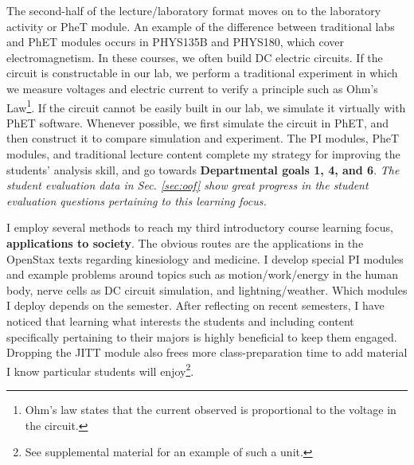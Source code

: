 \documentclass[../../../main.tex]{subfiles}
\begin{document}
The second-half of the lecture/laboratory format moves on to the laboratory activity or PheT module.  An example of the difference between traditional labs and PhET modules occurs in PHYS135B and PHYS180, which cover electromagnetism.  In these courses, we often build DC electric circuits.  If the circuit is constructable in our lab, we perform a traditional experiment in which we measure voltages and electric current to verify a principle such as Ohm's Law\footnote{Ohm's law states that the current observed is proportional to the voltage in the circuit.}.  If the circuit cannot be easily built in our lab, we simulate it virtually with PhET software.  Whenever possible, we first simulate the circuit in PhET, and then construct it to compare simulation and experiment.  The PI modules, PheT modules, and traditional lecture content complete my strategy for improving the students' analysis skill, and go towards \textbf{Departmental goals 1, 4, and 6}.  \textit{The student evaluation data in Sec. \ref{sec:oof} show great progress in the student evaluation questions pertaining to this learning focus.} \\ \hspace{0.1cm}

I employ several methods to reach my third introductory course learning focus, \textbf{applications to society}.  The obvious routes are the applications in the OpenStax texts \cite{openstax1} regarding kinesiology and medicine.  I develop special PI modules and example problems around topics such as motion/work/energy in the human body, nerve cells as DC circuit simulation, and lightning/weather.  Which modules I deploy depends on the semester.  After reflecting on recent semesters, I have noticed that learning what interests the students and including content specifically pertaining to their majors is highly beneficial to keep them engaged.  Dropping the JITT module also frees more class-preparation time to add material I know particular students will enjoy\footnote{See supplemental material for an example of such a unit.}. \\ \hspace{0.1cm}
\end{document}
